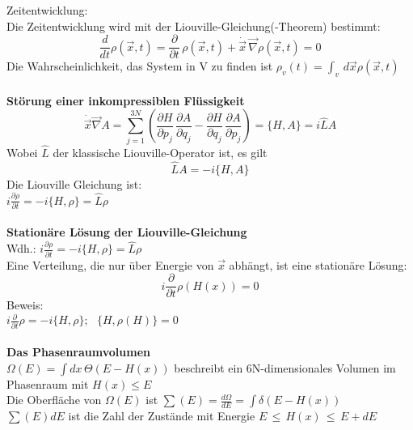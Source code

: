 \documentclass[a4paper,11pt]{scrartcl}
\begin{document}
Zeitentwicklung:\\
Die Zeitentwicklung wird mit der Liouville-Gleichung(-Theorem) bestimmt:
\begin{equation}
 \frac{d}{dt} \rho(\vec{x},t) = \frac{\partial }{\partial t}\,  \rho(\vec{x},t)+\dot{\vec{x}}\, \vec{\nabla} \rho(\vec{x},t) = 0
\end{equation}
Die Wahrscheinlichkeit, das System in V zu finden ist $\rho_v(t)= \int_v\, d \vec{x} \rho(\vec{x},t)$\\
\\
\textbf{Störung einer inkompressiblen Flüssigkeit}
\begin{equation}
 \dot{\vec{x}} \vec{\nabla} A = \sum_{j=1}^{3N} \left( \frac{\partial H}{\partial p_j} \, \frac{\partial A}{\partial q_j} - \frac{\partial H}{\partial q_j} \, 
 \frac{\partial A}{\partial p_j} \right)= \{H,A\} =  i \hat{L} A
\end{equation}
Wobei $\hat{L}$ der klassische Liouville-Operator ist, es gilt $$ \hat{L} A = -i \{ H, A \}$$
Die Liouville Gleichung ist:\\
$
    i \frac{\partial \rho}{\partial t} = -i \{H , \rho \} = \hat{L} \rho
$\\
\\
\textbf{Stationäre Lösung der Liouville-Gleichung}\\
Wdh.: $ i\frac{\partial \rho}{\partial t} = - i \{H, \rho \} = \hat{L} \rho$\\
Eine Verteilung, die nur über Energie von $\vec{x}$ abhängt, ist eine stationäre Lösung: 
$$i \frac{\partial }{\partial t} \rho (H(x)) = 0$$
Beweis: \\
$ i \frac{\partial }{\partial t} \rho = -i \{H, \rho \}; \,\,\,\, \{H, \rho(H) \} = 0 $\\
\\
\textbf{Das Phasenraumvolumen}\\
$\Omega(E) = \int dx \, \Theta(E-H(x))$ beschreibt ein 6N-dimensionales Volumen im Phasenraum mit $H(x) \leq  E $\\
Die Oberfläche von $\Omega(E)$ ist $\sum(E) = \frac{d \Omega}{d E} = \int \delta (E- H(x))$\\
$\sum (E) dE$ ist die Zahl der Zustände mit Energie $E\, \leq\, H(x)\,  \leq \, E+dE$\\
\\
\end{document}
